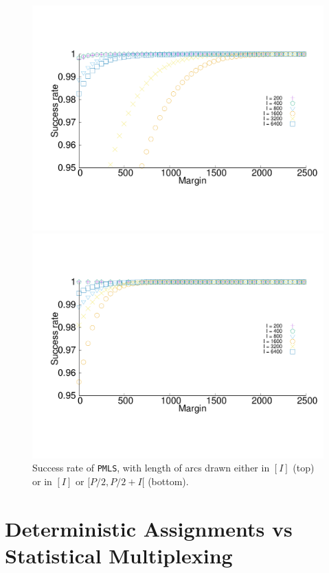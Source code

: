\documentclass[a4paper,10pt]{journal}
\newcommand\PMLS{\texttt{PMLS}\xspace}
\begin{document}
           \begin{figure}
    
       \begin{center}
      \includegraphics[width = 0.6\linewidth]{departs_distrib1Grp.pdf}
     
     
     
         
      \includegraphics[width = 0.6\linewidth]{departs_distrib2Grp.pdf}
   
  
         \end{center}
         \caption{Success rate of \PMLS, with length of arcs drawn either in $[I]$ (top) or in $[I]$ or $[P/2,P/2 + I[$ (bottom).}
      \label{fig:2grp} 
  \end{figure}
\section{Deterministic Assignments vs Statistical Multiplexing}\label{sec:comparison}
\end{document}
